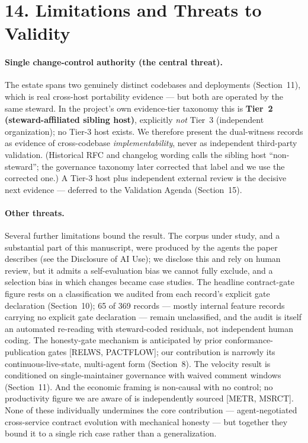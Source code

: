 \documentclass[11pt]{article}
\begin{document}
\section*{14. Limitations and Threats to Validity}
\paragraph{Single change-control authority (the central threat).} The estate spans two genuinely
distinct codebases and deployments (Section~11), which is real cross-host portability evidence ---
but both are operated by the same steward. In the project's own evidence-tier taxonomy this is
\textbf{Tier~2 (steward-affiliated sibling host)}, explicitly \emph{not} Tier~3 (independent
organization); no Tier-3 host exists. We therefore present the dual-witness records as evidence of
cross-codebase \emph{implementability}, never as independent third-party validation. (Historical RFC
and changelog wording calls the sibling host ``non-steward''; the governance taxonomy later corrected
that label and we use the corrected one.) A Tier-3 host plus independent external review is the
decisive next evidence --- deferred to the Validation Agenda (Section~15).
\paragraph{Other threats.} Several further limitations bound the result. The corpus under study, and a
substantial part of this manuscript, were produced by the agents the paper describes (see the
Disclosure of AI Use); we disclose this and rely on human review, but it admits a self-evaluation bias
we cannot fully exclude, and a selection bias in which changes became case studies. The headline contract-gate figure rests on a classification
we audited from each record's explicit gate declaration (Section~10); 65 of 369 records --- mostly
internal feature records carrying no explicit gate declaration --- remain unclassified, and the
audit is itself an automated re-reading with steward-coded residuals, not independent human coding. The
honesty-gate mechanism is anticipated by prior conformance-publication gates [RELWS, PACTFLOW]; our
contribution is narrowly its continuous-live-state, multi-agent form (Section~8). The velocity result
is conditioned on single-maintainer governance with waived comment windows (Section~11). And the
economic framing is non-causal with no control; no productivity figure we are aware of is
independently sourced [METR, MSRCT]. None of these individually undermines the core contribution ---
agent-negotiated cross-service contract evolution with mechanical honesty --- but together they bound
it to a single rich case rather than a generalization.
\end{document}
